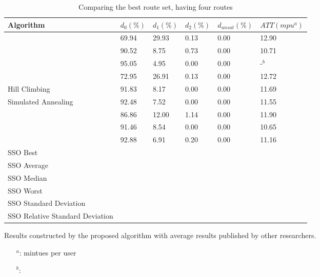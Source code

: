 \begin{table}[H]
	\centering
    \hspace*{-1.0cm}
    \begin{tabular}{|l||l|l|l|l|l|}
 	\hline
 	Algorithm & $d_0(\%)$ & $d_1(\%)$ & $d_2(\%)$ & $d_{unsat}(\%)$ & $ATT(mpu^a)$ \\
 	\hline
    \citet{mandl79} & 69.94 & 29.93 & 0.13 & 0.00 & 12.90 \\
    \citet{kechagiopoulos14} & 90.52 & 8.75 & 0.73 & 0.00 & 10.71 \\
    \citet{nikolic14} & 95.05 & 4.95 & 0.00 & 0.00 & -$^b$ \\
    \citet{kidwai98} & 72.95 & 26.91 & 0.13 & 0.00 & 12.72 \\
    \citet{fan09} Hill Climbing & 91.83 & 8.17 & 0.00 & 0.00 & 11.69 \\
    \citet{fan09} Simulated Annealing & 92.48 & 7.52 & 0.00 & 0.00 & 11.55 \\
    \citet{chakroborty02} & 86.86 & 12.00 & 1.14 & 0.00 & 11.90 \\
    \citet{zhang10} & 91.46 & 8.54 & 0.00 & 0.00 & 10.65 \\
    \citet{chew12} & 92.88 & 6.91 & 0.20 & 0.00 & 11.16 \\
	\hline
    \hline
    SSO Best & ~ & ~ & ~ & ~ & ~ \\
    SSO Average & ~ & ~ & ~ & ~ & ~ \\
    SSO Median & ~ & ~ & ~ & ~ & ~ \\
    SSO Worst & ~ & ~ & ~ & ~ & ~ \\
    SSO Standard Deviation & ~ & ~ & ~ & ~ & ~ \\
    SSO Relative Standard Deviation & ~ & ~ & ~ & ~ & ~ \\
    \hline
    \end{tabular}
    \caption {Comparing the best route set, having four routes}
    Results constructed by the proposed algorithm with average results published by other researchers.
    \begin{itemize}[noitemsep]
    \item[$^a$:] mintues per user
    \item[$^b$:] 
    \end{itemize}
    \label{table:performanceComparison_4}
	\end{table}


